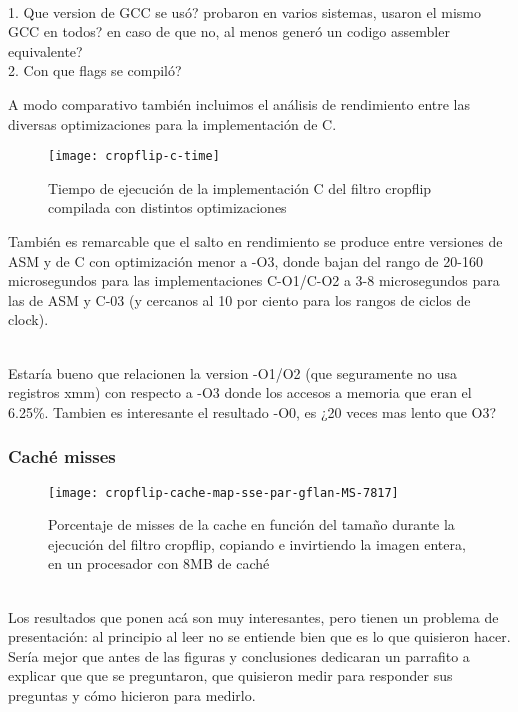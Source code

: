\cuidado \\
1. Que version de GCC se usó? probaron en varios sistemas, usaron el mismo GCC en todos? en caso de que no, al menos generó un codigo assembler equivalente? \\
2. Con que flags se compiló? \\
\cuidado

A modo comparativo también incluimos el análisis de rendimiento entre las diversas optimizaciones para la implementación de C.

\begin{figure}[H]
\centering
\texttt{[image: cropflip-c-time]}
\label{fig:cropflip-c-time}
\caption{Tiempo de ejecución de la implementación C del filtro cropflip compilada con distintos optimizaciones}
\end{figure}

También es remarcable que el salto en rendimiento se produce entre versiones de ASM y de C con optimización menor a -O3, donde bajan del rango de 20-160 microsegundos para las implementaciones C-O1/C-O2 a 3-8 microsegundos para las de ASM y C-03 (y cercanos al 10 por ciento para los rangos de ciclos de clock).

\cuidado \\
Estaría bueno que relacionen la version -O1/O2 (que seguramente no usa registros xmm) con respecto a -O3 donde los accesos a memoria que eran el 6.25\%. Tambien es interesante el resultado -O0, es ¿20 veces mas lento que O3?
\cuidado

\subsubsection{Caché misses}

\begin{figure}[H]
\centering
\texttt{[image: cropflip-cache-map-sse-par-gflan-MS-7817]}
\caption{Porcentaje de misses de la cache en función del tamaño durante la ejecución del filtro cropflip, copiando e invirtiendo la imagen entera, en un procesador con 8MB de caché}
\label{fig:cropflip-cache-map-sse_par-gflan-MS-7817}
\end{figure}

\cuidado \\
Los resultados que ponen acá son muy interesantes, pero tienen un problema de presentación: al principio al leer no se entiende bien que es lo que quisieron hacer. Sería mejor que antes de las figuras y conclusiones dedicaran un parrafito a explicar que que se preguntaron, que quisieron medir para responder sus preguntas y cómo hicieron para medirlo.
\cuidado

